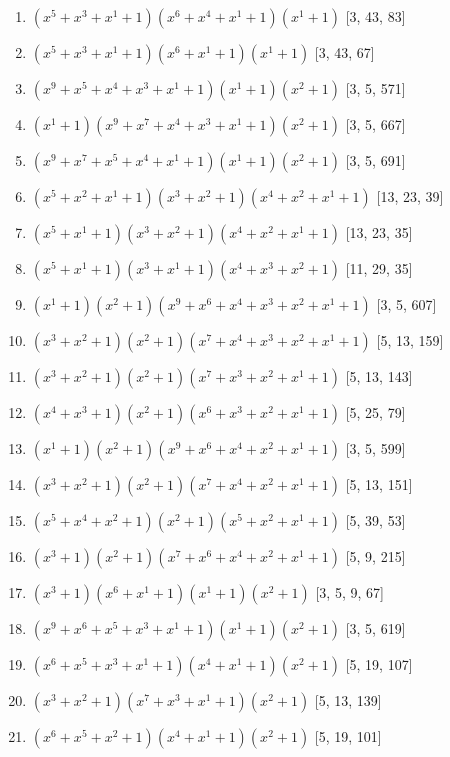 \documentclass[10pt,twocolumn]{article}
\begin{document}
\begin{enumerate}
\item $(x^{5} + x^{3} + x^{1} + 1)(x^{6} + x^{4} + x^{1} + 1)(x^{1} + 1)$  [3, 43, 83]
\item $(x^{5} + x^{3} + x^{1} + 1)(x^{6} + x^{1} + 1)(x^{1} + 1)$  [3, 43, 67]
\item $(x^{9} + x^{5} + x^{4} + x^{3} + x^{1} + 1)(x^{1} + 1)(x^{2} + 1)$  [3, 5, 571]
\item $(x^{1} + 1)(x^{9} + x^{7} + x^{4} + x^{3} + x^{1} + 1)(x^{2} + 1)$  [3, 5, 667]
\item $(x^{9} + x^{7} + x^{5} + x^{4} + x^{1} + 1)(x^{1} + 1)(x^{2} + 1)$  [3, 5, 691]
\item $(x^{5} + x^{2} + x^{1} + 1)(x^{3} + x^{2} + 1)(x^{4} + x^{2} + x^{1} + 1)$  [13, 23, 39]
\item $(x^{5} + x^{1} + 1)(x^{3} + x^{2} + 1)(x^{4} + x^{2} + x^{1} + 1)$  [13, 23, 35]
\item $(x^{5} + x^{1} + 1)(x^{3} + x^{1} + 1)(x^{4} + x^{3} + x^{2} + 1)$  [11, 29, 35]
\item $(x^{1} + 1)(x^{2} + 1)(x^{9} + x^{6} + x^{4} + x^{3} + x^{2} + x^{1} + 1)$  [3, 5, 607]
\item $(x^{3} + x^{2} + 1)(x^{2} + 1)(x^{7} + x^{4} + x^{3} + x^{2} + x^{1} + 1)$  [5, 13, 159]
\item $(x^{3} + x^{2} + 1)(x^{2} + 1)(x^{7} + x^{3} + x^{2} + x^{1} + 1)$  [5, 13, 143]
\item $(x^{4} + x^{3} + 1)(x^{2} + 1)(x^{6} + x^{3} + x^{2} + x^{1} + 1)$  [5, 25, 79]
\item $(x^{1} + 1)(x^{2} + 1)(x^{9} + x^{6} + x^{4} + x^{2} + x^{1} + 1)$  [3, 5, 599]
\item $(x^{3} + x^{2} + 1)(x^{2} + 1)(x^{7} + x^{4} + x^{2} + x^{1} + 1)$  [5, 13, 151]
\item $(x^{5} + x^{4} + x^{2} + 1)(x^{2} + 1)(x^{5} + x^{2} + x^{1} + 1)$  [5, 39, 53]
\item $(x^{3} + 1)(x^{2} + 1)(x^{7} + x^{6} + x^{4} + x^{2} + x^{1} + 1)$  [5, 9, 215]
\item $(x^{3} + 1)(x^{6} + x^{1} + 1)(x^{1} + 1)(x^{2} + 1)$  [3, 5, 9, 67]
\item $(x^{9} + x^{6} + x^{5} + x^{3} + x^{1} + 1)(x^{1} + 1)(x^{2} + 1)$  [3, 5, 619]
\item $(x^{6} + x^{5} + x^{3} + x^{1} + 1)(x^{4} + x^{1} + 1)(x^{2} + 1)$  [5, 19, 107]
\item $(x^{3} + x^{2} + 1)(x^{7} + x^{3} + x^{1} + 1)(x^{2} + 1)$  [5, 13, 139]
\item $(x^{6} + x^{5} + x^{2} + 1)(x^{4} + x^{1} + 1)(x^{2} + 1)$  [5, 19, 101]

\end{enumerate}
\end{document}
